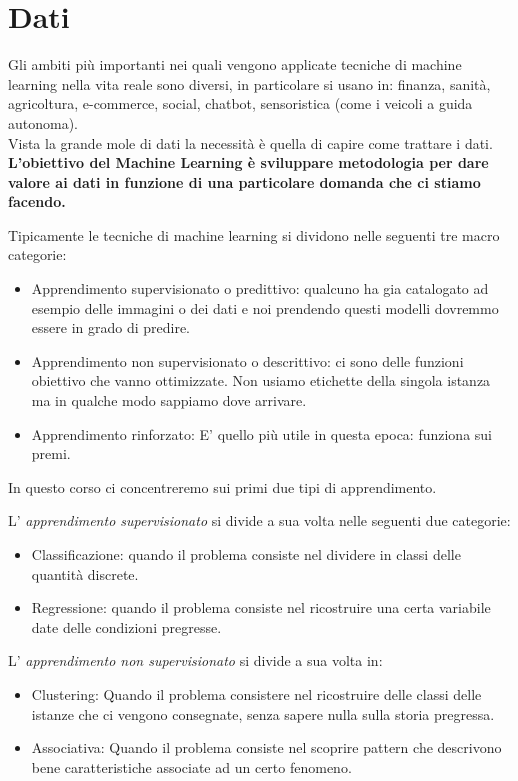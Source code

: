 \pagestyle{fancy}
\cfoot{\thepage}
\renewcommand{\footrulewidth}{0.25pt}


\section{Dati}
Gli ambiti più importanti nei quali vengono applicate tecniche di machine learning nella vita reale sono diversi, in particolare si usano in:
finanza, sanità, agricoltura, e-commerce, social, chatbot, sensoristica (come i veicoli a guida autonoma).
\\ Vista la grande mole di dati la necessità è quella di capire come trattare i dati.
\textbf{L'obiettivo del Machine Learning è sviluppare metodologia per dare valore ai dati in funzione di una particolare domanda che ci stiamo facendo.}

Tipicamente le tecniche di machine learning si dividono nelle seguenti tre macro categorie:
\begin{itemize}
	\item Apprendimento supervisionato o predittivo: qualcuno ha gia catalogato ad esempio delle immagini o dei dati e noi prendendo questi modelli dovremmo essere in grado di predire.
	\item Apprendimento non supervisionato o descrittivo: ci sono delle funzioni obiettivo che vanno ottimizzate. Non usiamo etichette della singola istanza ma in qualche modo sappiamo dove arrivare.
	\item Apprendimento rinforzato: E' quello più utile in questa epoca: funziona sui premi.
\end{itemize}

In questo corso ci concentreremo sui primi due tipi di apprendimento.

L' \textit{apprendimento supervisionato} si divide a sua volta nelle seguenti due categorie:
\begin{itemize}
	\item Classificazione: quando il problema consiste nel dividere in classi delle quantità discrete.
	\item Regressione: quando il problema consiste nel ricostruire una certa variabile date delle condizioni pregresse.
\end{itemize}

L' \textit{apprendimento non supervisionato} si divide a sua volta in:
\begin{itemize}
	\item Clustering: Quando il problema consistere nel ricostruire delle classi delle istanze che ci vengono consegnate, senza sapere nulla sulla storia pregressa.
	\item Associativa: Quando il problema consiste nel scoprire pattern che descrivono bene caratteristiche associate ad un certo fenomeno.
\end{itemize}

